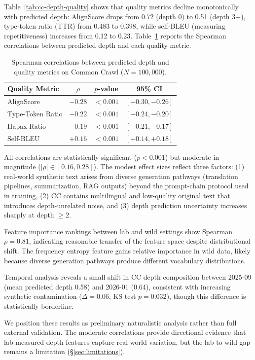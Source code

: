 \documentclass[11pt]{article}
\begin{document}
Table~\ref{tab:cc-depth-quality} shows that quality metrics decline monotonically with predicted depth: AlignScore drops from 0.72 (depth 0) to 0.51 (depth 3+), type-token ratio (TTR) from 0.483 to 0.398, while self-BLEU (measuring repetitiveness) increases from 0.12 to 0.23. Table~\ref{tab:cc-spearman} reports the Spearman correlations between predicted depth and each quality metric.

\begin{table}[t]
\centering
\caption{Spearman correlations between predicted depth and quality metrics on Common Crawl ($N = 100{,}000$).}
\label{tab:cc-spearman}
\small
\begin{tabular}{lccc}
\toprule
Quality Metric & $\rho$ & $p$-value & 95\% CI \\
\midrule
AlignScore & $-0.28$ & $<0.001$ & $[-0.30, -0.26]$ \\
Type-Token Ratio & $-0.22$ & $<0.001$ & $[-0.24, -0.20]$ \\
Hapax Ratio & $-0.19$ & $<0.001$ & $[-0.21, -0.17]$ \\
Self-BLEU & $+0.16$ & $<0.001$ & $[+0.14, +0.18]$ \\
\bottomrule
\end{tabular}
\end{table}

All correlations are statistically significant ($p < 0.001$) but moderate in magnitude ($|\rho| \in [0.16, 0.28]$). The modest effect sizes reflect three factors: (1) real-world synthetic text arises from diverse generation pathways (translation pipelines, summarization, RAG outputs) beyond the prompt-chain protocol used in training, (2) CC contains multilingual and low-quality original text that introduces depth-unrelated noise, and (3) depth prediction uncertainty increases sharply at depth $\ge 2$.

Feature importance rankings between lab and wild settings show Spearman $\rho = 0.81$, indicating reasonable transfer of the feature space despite distributional shift. The frequency entropy feature gains relative importance in wild data, likely because diverse generation pathways produce different vocabulary distributions.

Temporal analysis reveals a small shift in CC depth composition between 2025-09 (mean predicted depth 0.58) and 2026-01 (0.64), consistent with increasing synthetic contamination ($\Delta = 0.06$, KS test $p = 0.032$), though this difference is statistically borderline.

We position these results as preliminary naturalistic analysis rather than full external validation. The moderate correlations provide directional evidence that lab-measured depth features capture real-world variation, but the lab-to-wild gap remains a limitation (\S\ref{sec:limitations}).
\end{document}
